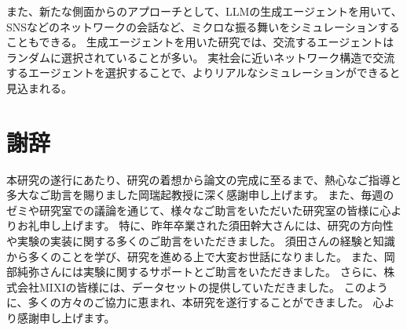 \documentclass[uplatex,11pt,openany]{ujreport}
\renewcommand{\bibname}{参考文献}
\begin{document}
    また、新たな側面からのアプローチとして、LLMの生成エージェントを用いて、SNSなどのネットワークの会話など、ミクロな振る舞いをシミュレーションすることもできる。
    生成エージェントを用いた研究では、交流するエージェントはランダムに選択されていることが多い。
    実社会に近いネットワーク構造で交流するエージェントを選択することで、よりリアルなシミュレーションができると見込まれる。










\chapter*{謝辞}
    本研究の遂行にあたり、研究の着想から論文の完成に至るまで、熱心なご指導と多大なご助言を賜りました岡瑞起教授に深く感謝申し上げます。
    また、毎週のゼミや研究室での議論を通じて、様々なご助言をいただいた研究室の皆様に心よりお礼申し上げます。
    特に、昨年卒業された須田幹大さんには、研究の方向性や実験の実装に関する多くのご助言をいただきました。
    須田さんの経験と知識から多くのことを学び、研究を進める上で大変お世話になりました。
    また、岡部純弥さんには実験に関するサポートとご助言をいただきました。
    さらに、株式会社MIXIの皆様には、データセットの提供していただきました。
    このように、多くの方々のご協力に恵まれ、本研究を遂行することができました。
    心より感謝申し上げます。


\newpage


% 
% 





\end{document}

